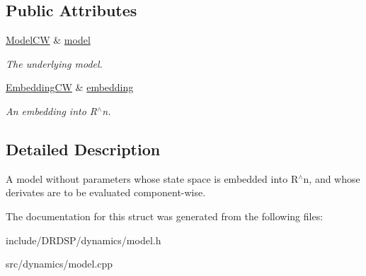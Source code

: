 \subsection*{Public Attributes}
\begin{DoxyCompactItemize}
\item 
\hypertarget{struct_d_r_d_s_p_1_1_model_embedded_c_w_a8f582175d25ab090a16ac5ca44c3424e}{\hyperlink{struct_d_r_d_s_p_1_1_model_c_w}{Model\-C\-W} \& \hyperlink{struct_d_r_d_s_p_1_1_model_embedded_c_w_a8f582175d25ab090a16ac5ca44c3424e}{model}}\label{struct_d_r_d_s_p_1_1_model_embedded_c_w_a8f582175d25ab090a16ac5ca44c3424e}

\begin{DoxyCompactList}\small\item\em The underlying model. \end{DoxyCompactList}\item 
\hypertarget{struct_d_r_d_s_p_1_1_model_embedded_c_w_abd957dbddb85f3625f5029604a88b5a8}{\hyperlink{struct_d_r_d_s_p_1_1_embedding_c_w}{Embedding\-C\-W} \& \hyperlink{struct_d_r_d_s_p_1_1_model_embedded_c_w_abd957dbddb85f3625f5029604a88b5a8}{embedding}}\label{struct_d_r_d_s_p_1_1_model_embedded_c_w_abd957dbddb85f3625f5029604a88b5a8}

\begin{DoxyCompactList}\small\item\em An embedding into R$^\wedge$n. \end{DoxyCompactList}\end{DoxyCompactItemize}


\subsection{Detailed Description}
A model without parameters whose state space is embedded into R$^\wedge$n, and whose derivates are to be evaluated component-\/wise. 

The documentation for this struct was generated from the following files\-:\begin{DoxyCompactItemize}
\item 
include/\-D\-R\-D\-S\-P/dynamics/model.\-h\item 
src/dynamics/model.\-cpp\end{DoxyCompactItemize}
